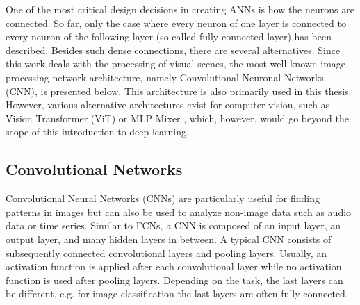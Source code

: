 One of the most critical design decisions in creating ANNs is how the neurons are connected.
So far, only the case where every neuron of one layer is connected to every neuron of the following layer (so-called fully connected layer) has been described. 
Besides such dense connections, there are several alternatives.
Since this work deals with the processing of visual scenes, the most well-known image-processing network architecture, namely Convolutional Neuronal Networks (CNN), is presented below. This architecture is also primarily used in this thesis. However, various alternative architectures exist for computer vision, such as Vision Transformer (ViT)  or MLP Mixer , which, however, would go beyond the scope of this introduction to deep learning.























\subsection{Convolutional Networks}
Convolutional Neural Networks (CNNs) are particularly useful for finding patterns in images but can also be used to analyze non-image data such as audio data or time series.
Similar to FCNs, a CNN is composed of an input layer, an output layer, and many hidden layers in between.
A typical CNN consists of subsequently connected convolutional layers and pooling layers.
Usually, an activation function is applied after each convolutional layer while no activation function is used after pooling layers.
Depending on the task, the last layers can be different, e.g. for image classification the last layers are often fully connected.

